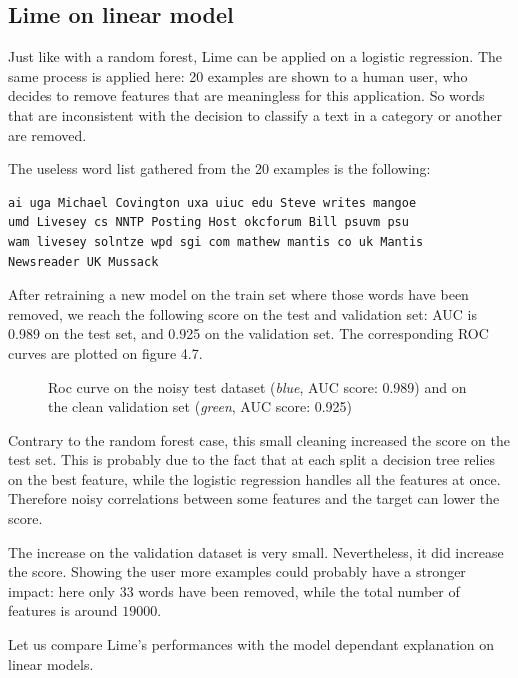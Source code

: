 \documentclass[a4paper,11pt]{kth-mag}
\begin{document}
\subsection{Lime on linear model}

Just like with a random forest, Lime can be applied on a logistic regression. The same process is applied here: 20 examples are shown to a human user, who decides to remove features that are meaningless for this application. So words that are inconsistent with the decision to classify a text in a category or another are removed.

The useless word list gathered from the 20 examples is the following: 

\begin{center}
\begin{verbatim}
ai uga Michael Covington uxa uiuc edu Steve writes mangoe 
umd Livesey cs NNTP Posting Host okcforum Bill psuvm psu 
wam livesey solntze wpd sgi com mathew mantis co uk Mantis
Newsreader UK Mussack
\end{verbatim}
\end{center}

After retraining a new model on the train set where those words have been removed, we reach the following score on the test and validation set: AUC is 0.989 on the test set, and 0.925 on the validation set. The corresponding ROC curves are plotted on figure 4.7.

\begin{figure}[h!]
		\centering
    	\def\svgwidth{\columnwidth}
    	\resizebox{0.6\textwidth}{!}{}
    	\caption{Roc curve on the noisy test dataset (\textit{blue}, AUC score: 0.989) and on the clean validation set (\textit{green}, AUC score: 0.925)}
\end{figure}

Contrary to the random forest case, this small cleaning increased the score on the test set. This is probably due to the fact that at each split a decision tree relies on the best feature, while the logistic regression handles all the features at once. Therefore noisy correlations between some features and the target can lower the score.

The increase on the validation dataset is very small. Nevertheless, it did increase the score. Showing the user more examples could probably have a stronger impact: here only 33 words have been removed, while the total number of features is around $19000$.

Let us compare Lime's performances with the model dependant explanation on linear models.
\end{document}
